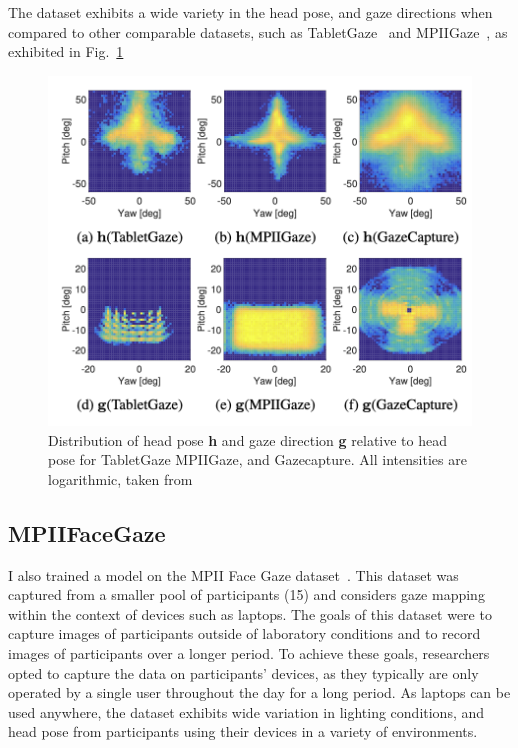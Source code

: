 \documentclass[twocolumn]{report}
\begin{document}
The dataset exhibits a wide variety in the head pose, and gaze directions when compared to other comparable datasets, such as TabletGaze~\cite{huang2016tabletgaze} and MPIIGaze~\cite{zhang15cvpr}, as exhibited in Fig.~\ref{fig:gazecapture-distribution}

\begin{figure}[h]
    \begin{center}
        \includegraphics[scale=0.5]{../assets/Screenshot 2024-04-11 at 13.09.16.png}
    \end{center}
    \caption{Distribution of head pose \textbf{h} and gaze direction \textbf{g} relative to head pose for TabletGaze MPIIGaze, and Gazecapture. All intensities are logarithmic, taken from~\cite{krafka2016eye}}
    \label{fig:gazecapture-distribution}
\end{figure}

\subsection{MPIIFaceGaze}

I also trained a model on the MPII Face Gaze dataset~\cite{zhang2019mpii}. This dataset was captured from a smaller pool of participants (15) and considers gaze mapping within the context of devices such as laptops. The goals of this dataset were to capture images of participants outside of laboratory conditions and to record images of participants over a longer period. To achieve these goals, researchers opted to capture the data on participants' devices, as they typically are only operated by a single user throughout the day for a long period. As laptops can be used anywhere, the dataset exhibits wide variation in lighting conditions, and head pose from participants using their devices in a variety of environments. 
\end{document}
